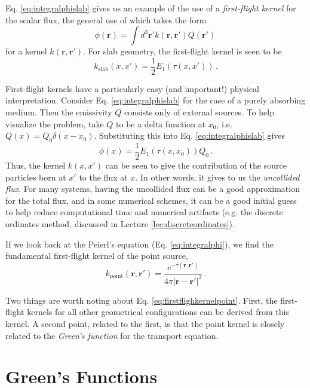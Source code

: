 Eq. \ref{eq:integralphislab} gives us an example of the use of a \textit{first-flight kernel} for the scalar flux, the general use of which takes the form
\begin{equation}
 \phi(\mathbf{r}) = \int d^3\mathbf{r}' k(\mathbf{r},\mathbf{r}')Q(\mathbf{r}') \, 
\end{equation}
for a kernel $k(\mathbf{r},\mathbf{r'})$.  For slab geometry, the first-flight kernel is seen to be
\begin{equation}
 k_{\text{slab}}(x,x') = \frac{1}{2} E_1(\tau(x,x')) \, .
 \label{eq:firstflightkernelslab}
\end{equation}

First-flight kernels have a particularly easy (and important!) physical interpretation. Consider Eq. \ref{eq:integralphislab} for the case of a purely absorbing medium.  Then the emissivity $Q$ consists only of external sources.  To help visualize the problem, take $Q$ to be a delta function at $x_0$, i.e. $Q(x) = Q_0 \delta(x-x_0)$.  Substituting this into Eq. \ref{eq:integralphislab} gives
\begin{equation}
 \phi(x) = \frac{1}{2} E_1(\tau(x,x_0)) Q_0 \, . 
\end{equation}
Thus, the kernel $k(x,x')$ can be seen to give the contribution of the source particles born at $x'$ to the flux at $x$.  In other words, it gives to us the \textit{uncollided flux}.  For many systems, having the uncollided flux can be a good approximation for the total flux, and in some numerical schemes, it can be a good initial guess to help reduce computational time and numerical artifacts (e.g. the discrete ordinates method, discussed in Lecture \ref{lec:discreteordinates}).

If we look back at the Peierl's equation (Eq. \ref{eq:integralphi}), we find the fundamental first-flight kernel of the point source, 
\begin{equation}
 k_{\text{point}}(\mathbf{r},\mathbf{r}') = \frac{e^{-\tau(\mathbf{r},\mathbf{r}')}}{4\pi|\mathbf{r}-\mathbf{r}'|^2} \, .
 \label{eq:firstflighkernelpoint}
\end{equation}

Two things are worth noting about Eq. \ref{eq:firstflighkernelpoint}.  First, the first-flight kernels for all other geometrical configurations can be derived from this kernel.  A second point, related to the first, is that the point kernel is closely related to the \textit{Green's function} for the transport equation.  

\section*{Green's Functions}


